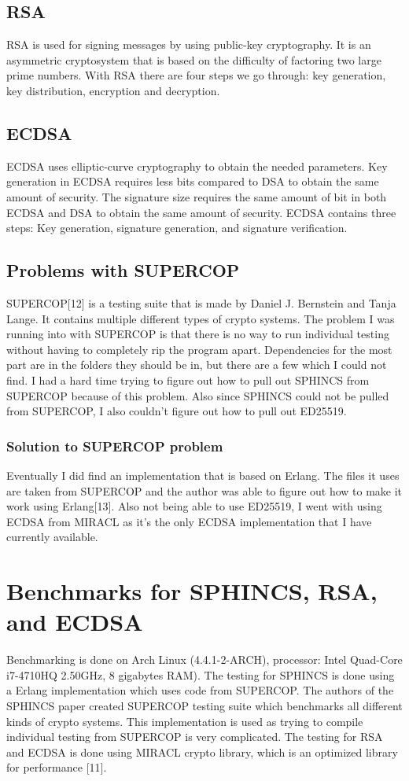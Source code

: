 \documentclass[]{scrartcl}
\begin{document}
\subsection*{RSA}
RSA is used for signing messages by using public-key cryptography. It is an asymmetric cryptosystem that is based on the difficulty of factoring two large prime numbers. With RSA there are four steps we go through: key generation, key distribution, encryption and decryption.

\subsection*{ECDSA}
ECDSA uses elliptic-curve cryptography to obtain the needed parameters. Key generation in ECDSA requires less bits compared to DSA to obtain the same amount of security. The signature size requires the same amount of bit in both ECDSA and DSA to obtain the same amount of security. ECDSA contains three steps: Key generation, signature generation, and signature verification.

\subsection*{Problems with SUPERCOP}
SUPERCOP[12] is a testing suite that is made by Daniel J. Bernstein and Tanja Lange. It contains multiple different types of crypto systems. The problem I was running into with SUPERCOP is that there is no way to run individual testing without having to completely rip the program apart. Dependencies for the most part are in the folders they should be in, but there are a few which I could not find. I had a hard time trying to figure out how to pull out SPHINCS from SUPERCOP because of this problem. Also since SPHINCS could not be pulled from SUPERCOP, I also couldn't figure out how to pull out ED25519.

\subsubsection*{Solution to SUPERCOP problem}
Eventually I did find an implementation that is based on Erlang. The files it uses are taken from SUPERCOP and the author was able to figure out how to make it work using Erlang[13]. Also not being able to use ED25519, I went with using ECDSA from MIRACL as it's the only ECDSA implementation that I have currently available.

\section*{Benchmarks for SPHINCS, RSA, and ECDSA}
Benchmarking is done on Arch Linux (4.4.1-2-ARCH), processor: Intel Quad-Core i7-4710HQ 2.50GHz, 8 gigabytes RAM). The testing for SPHINCS is done using a Erlang implementation which uses code from SUPERCOP. The authors of the SPHINCS paper created SUPERCOP testing suite which benchmarks all different kinds of crypto systems. This implementation is used as trying to compile individual testing from SUPERCOP is very complicated. The testing for RSA and ECDSA is done using MIRACL crypto library, which is an optimized library for performance [11].
\end{document}
